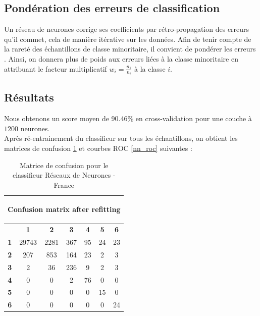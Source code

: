 \documentclass{book}
\begin{document}
\subsection{Pondération des erreurs de classification}

Un réseau de neurones corrige ses coefficients par rétro-propagation des erreurs qu'il commet, cela de manière itérative sur les données. Afin de tenir compte de la rareté des échantillons de classe minoritaire, 
il convient de pondérer les erreurs . Ainsi, on donnera plus de poids aux erreurs liées à la classe minoritaire en attribuant le facteur multiplicatif $w_i=\frac{n_1}{n_i}$ à la classe $i$.\\

\subsection{Résultats}

Nous obtenons un score moyen de 90.46\% en cross-validation pour une couche à $1200$ neurones. \\
Après ré-entrainement du classifieur sur tous les échantillons, on obtient les matrices de confusion \ref{nn_cm} et courbes ROC \ref{nn_roc} suivantes :

\begin{table}[H]
  \begin{center}
\begin{adjustbox}{max width=\textwidth}
  \begin{tabular}{|c|c|c|c|c|c|c|}
    \hline
    \multicolumn{7}{|c|}{{ \begin{bf}Confusion matrix after refitting\end{bf}}} \\
    \hline
     & \textbf{1} & \textbf{2} & \textbf{3} & \textbf{4} & \textbf{5} & \textbf{6}\\
    \hline
    \textbf{1} & 29743 & 2281 & 367 & 95 & 24 & 23\\
    \hline
    \textbf{2} & 207 & 853 & 164 & 23 & 2 & 3\\
    \hline
    \textbf{3} & 2 & 36 & 236 & 9 & 2 & 3\\
    \hline
    \textbf{4} & 0 & 0 & 2 & 76 & 0 & 0\\
    \hline
    \textbf{5} & 0 & 0 & 0 & 0 & 15 & 0\\
    \hline
    \textbf{6} & 0 & 0 & 0 & 0 & 0 & 24\\
    \hline
  \end{tabular}
  \end{adjustbox}
  \caption{Matrice de confusion pour le classifieur Réseaux de Neurones - France}
  \label{nn_cm}
  \end{center}
\end{table}
\end{document}
